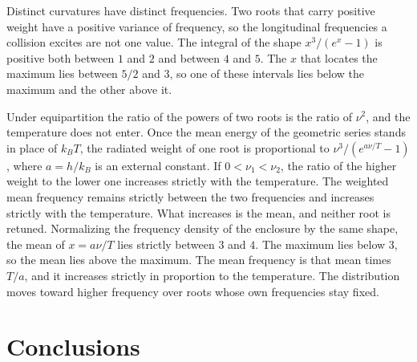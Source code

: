 \documentclass[a4paper]{article}
\begin{document}
Distinct curvatures have distinct frequencies. Two roots that carry positive weight have a positive variance of frequency, so the longitudinal frequencies a collision excites are not one value. The integral of the shape \(x^{3}/(e^{x}-1)\) is positive both between \(1\) and \(2\) and between \(4\) and \(5\). The \(x\) that locates the maximum lies between \(5/2\) and \(3\), so one of these intervals lies below the maximum and the other above it.

Under equipartition the ratio of the powers of two roots is the ratio of \(\nu^{2}\), and the temperature does not enter. Once the mean energy of the geometric series stands in place of \(k_B T\), the radiated weight of one root is proportional to \(\nu^{3}/(e^{a\nu/T}-1)\), where \(a=h/k_B\) is an external constant. If \(0<\nu_1<\nu_2\), the ratio of the higher weight to the lower one increases strictly with the temperature. The weighted mean frequency remains strictly between the two frequencies and increases strictly with the temperature. What increases is the mean, and neither root is retuned. Normalizing the frequency density of the enclosure by the same shape, the mean of \(x=a\nu/T\) lies strictly between \(3\) and \(4\). The maximum lies below \(3\), so the mean lies above the maximum. The mean frequency is that mean times \(T/a\), and it increases strictly in proportion to the temperature. The distribution moves toward higher frequency over roots whose own frequencies stay fixed.

\section{Conclusions}
\end{document}
